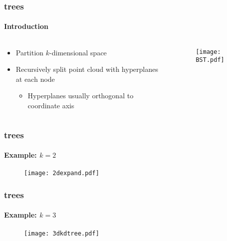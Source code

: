 

\begin{frame}
  \frametitle{\kd trees}
  \framesubtitle{Introduction}

  \begin{columns}[T]
    \begin{column}{.5\textwidth}
      \begin{itemize}
        \item Partition $k$-dimensional space
        \item Recursively split point cloud with hyperplanes at each node
          \begin{itemize}
            \item Hyperplanes usually orthogonal to coordinate axis
          \end{itemize}
      \end{itemize}
    \end{column}
    \begin{column}{.5\textwidth}
      \begin{figure}
        \centering
        \texttt{[image: BST.pdf]}
      \end{figure}
    \end{column}
  \end{columns}
\end{frame}

%
%  

\begin{frame}
  \frametitle{\kd trees}
  \framesubtitle{Example: $k=2$}
  
  \begin{figure}
    \centering
    \texttt{[image: 2dexpand.pdf]}
  \end{figure}

\end{frame}

\begin{frame}
  \frametitle{\kd trees}
  \framesubtitle{Example: $k=3$}
  
  \begin{figure}
    \centering
    \texttt{[image: 3dkdtree.pdf]}
  \end{figure}

\end{frame}



